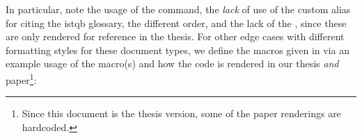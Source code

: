 In particular, note the usage of the  command, the \emph{lack} of
use of the custom alias for citing the \acs{istqb} glossary, the different
order, and the lack of the , since these are only rendered for
reference in the thesis. For other edge cases with different formatting styles
for these document types, we define the macros given in 
via an example usage of the macro(s) and how the code is rendered in our thesis
\emph{and} paper\footnote{Since this document is the thesis version, some of
    the paper renderings are hardcoded.}:


